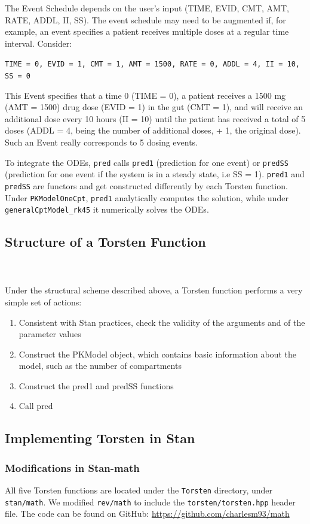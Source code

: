\documentclass[11pt]{amsart}
\begin{document}
The Event Schedule depends on the user's input (TIME, EVID, CMT, AMT, RATE, ADDL, II, SS). The event schedule may need to be augmented if, for example, an event specifies a patient receives multiple doses at a regular time interval. Consider:

\texttt{TIME = 0, EVID = 1, CMT = 1, AMT = 1500, RATE = 0, ADDL = 4, II = 10, SS = 0} 

This Event specifies that a time 0 (TIME = 0), a patient receives a 1500 mg (AMT = 1500) drug dose (EVID = 1) in the gut (CMT = 1), and will receive an additional dose every 10 hours (II = 10) until the patient has received a total of 5 doses (ADDL = 4, being the number of additional doses, + 1, the original dose). Such an Event really corresponds to 5 dosing events.

To integrate the ODEs, \texttt{pred} calls \texttt{pred1} (prediction for one event) or \texttt{predSS} (prediction for one event if the system is in a steady state, i.e SS = 1). \texttt{pred1} and \texttt{predSS} are functors and get constructed differently by each Torsten function. Under \texttt{PKModelOneCpt}, \texttt{pred1} analytically computes the solution, while under \texttt{generalCptModel\_rk45} it numerically solves the ODEs.
 
\subsection{Structure of a Torsten Function}  \ \\ \ \\
Under the structural scheme described above, a Torsten function performs a very simple set of actions:
\begin{enumerate}
  \item Consistent with Stan practices, check the validity of the arguments and of the parameter values
  \item Construct the PKModel object, which contains basic information about the model, such as the number of compartments
  \item Construct the pred1 and predSS functions
  \item Call pred
\end{enumerate}  

\subsection{Implementing Torsten in Stan}
\subsubsection*{Modifications in Stan-math}
All five Torsten functions are located under the \texttt{Torsten} directory, under \texttt{stan/math}. We modified \texttt{rev/math} to include the \texttt{torsten/torsten.hpp} header file. The code can be found on GitHub: \url{https://github.com/charlesm93/math} 
\end{document}
